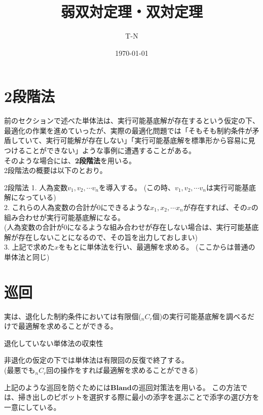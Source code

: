 \documentclass[platex,dvipdfmx]{jlreq}			%
\title{弱双対定理・双対定理}
\author{T-N}
\date{\today}
\begin{document}
\maketitle
\section{2段階法}

前のセクションで述べた単体法は、実行可能基底解が存在するという仮定の下、最適化の作業を進めていったが、実際の最適化問題では「そもそも制約条件が矛盾していて、実行可能解が存在しない」「実行可能基底解を標準形から容易に見つけることができない」ような事例に遭遇することがある。
\\
そのような場合には、\textbf{2段階法}を用いる。\\
2段階法の概要は以下のとおり。

\begin{itembox}[l]{2段階法}
1. 人為変数$v_1, v_2, \cdots  v_n$を導入する。
(この時、$v_1, v_2, \cdots  v_n$は実行可能基底解になっている)\\
2. これらの人為変数の合計が0にできるような$x_1, x_2, \cdots x_n$が存在すれば、その$x$の組み合わせが実行可能基底解になる。\\
(人為変数の合計が0になるような組み合わせが存在しない場合は、実行可能基底解が存在しないことになるので、その旨を出力しておしまい)\\
3. 上記で求めた$x$をもとに単体法を行い、最適解を求める。
(ここからは普通の単体法と同じ)
\end{itembox}



\section{巡回}
実は、退化した制約条件においては有限個(${}_n C_r$個)の実行可能基底解を調べるだけで最適解を求めることができる。
\\
\begin{itembox}[l]{退化していない単体法の収束性}

非退化の仮定の下では単体法は有限回の反復で終了する。\\
(最悪でも${}_n C_r$回の操作をすれば最適解を求めることができる)
\end{itembox}



上記のような$\textbf{巡回}$を防ぐためには$\textbf{Blandの巡回対策法}$を用いる。
この方法では、掃き出しのピボットを選択する際に最小の添字を選ぶことで添字の選び方を一意にしている。
\end{document}
